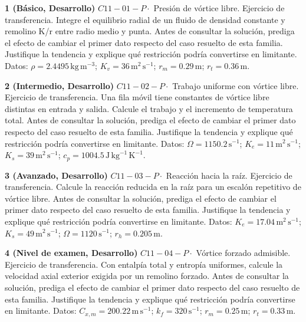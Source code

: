 \documentclass[10pt,openany]{book}
\begin{document}
\begin{tcolorbox}[title={Ejercicios propuestos}, studiumworked, breakable]

\noindent\textbf{1 (Básico, Desarrollo)}
\(C11-01-P \cdot\) Presión de vórtice libre. Ejercicio de transferencia. Integre el equilibrio radial de un fluido de densidad constante y remolino K/r entre radio medio y punta. Antes de consultar la solución, prediga el efecto de cambiar el primer dato respecto del caso resuelto de esta familia. Justifique la tendencia y explique qué restricción podría convertirse en limitante. Datos: \(\rho=2.4495\, \mathrm{kg}\,\mathrm{m}^{-3}\); \(K_v=36\, \mathrm{m}^{2}\,\mathrm{s}^{-1}\); \(r_m=0.29\, \mathrm{m}\); \(r_t=0.36\, \mathrm{m}\).

\noindent\textbf{2 (Intermedio, Desarrollo)}
\(C11-02-P \cdot\) Trabajo uniforme con vórtice libre. Ejercicio de transferencia. Una fila móvil tiene constantes de vórtice libre distintas en entrada y salida. Calcule el trabajo y el incremento de temperatura total. Antes de consultar la solución, prediga el efecto de cambiar el primer dato respecto del caso resuelto de esta familia. Justifique la tendencia y explique qué restricción podría convertirse en limitante. Datos: \(\Omega=1150.2\, \mathrm{s}^{-1}\); \(K_e=11\, \mathrm{m}^{2}\,\mathrm{s}^{-1}\); \(K_s=39\, \mathrm{m}^{2}\,\mathrm{s}^{-1}\); \(c_p=1004.5\, \mathrm{J}\,\mathrm{kg}^{-1}\,\mathrm{K}^{-1}\).

\noindent\textbf{3 (Avanzado, Desarrollo)}
\(C11-03-P \cdot\) Reacción hacia la raíz. Ejercicio de transferencia. Calcule la reacción reducida en la raíz para un escalón repetitivo de vórtice libre. Antes de consultar la solución, prediga el efecto de cambiar el primer dato respecto del caso resuelto de esta familia. Justifique la tendencia y explique qué restricción podría convertirse en limitante. Datos: \(K_e=17.04\, \mathrm{m}^{2}\,\mathrm{s}^{-1}\); \(K_s=49\, \mathrm{m}^{2}\,\mathrm{s}^{-1}\); \(\Omega=1120\, \mathrm{s}^{-1}\); \(r_h=0.205\, \mathrm{m}\).

\noindent\textbf{4 (Nivel de examen, Desarrollo)}
\(C11-04-P \cdot\) Vórtice forzado admisible. Ejercicio de transferencia. Con entalpía total y entropía uniformes, calcule la velocidad axial exterior exigida por un remolino forzado. Antes de consultar la solución, prediga el efecto de cambiar el primer dato respecto del caso resuelto de esta familia. Justifique la tendencia y explique qué restricción podría convertirse en limitante. Datos: \(C_{x,m}=200.22\, \mathrm{m}\,\mathrm{s}^{-1}\); \(k_f=320\, \mathrm{s}^{-1}\); \(r_m=0.25\, \mathrm{m}\); \(r_t=0.33\, \mathrm{m}\).
\end{tcolorbox}
\end{document}
